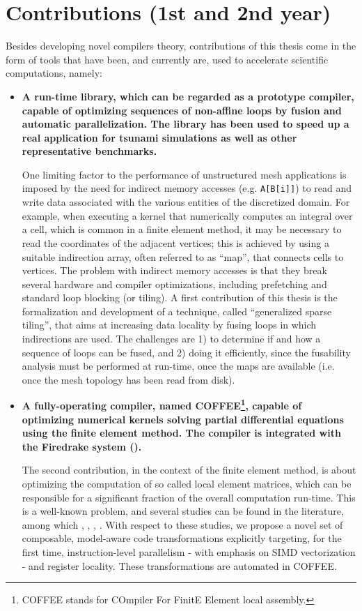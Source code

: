 \section{Contributions (1st and 2nd year)}
\label{sec:contributions}
Besides developing novel compilers theory, contributions of this thesis come in the form of tools that have been, and currently are, used to accelerate scientific computations, namely:
\begin{itemize}
\item \textbf{A run-time library, which can be regarded as a prototype compiler, capable of optimizing sequences of non-affine loops by fusion and automatic parallelization. The library has been used to speed up a real application for tsunami simulations as well as other representative benchmarks.}

One limiting factor to the performance of unstructured mesh applications is imposed by
the need for indirect memory accesses (e.g. \texttt{A[B[i]]}) to read and
write data associated with the various entities of the discretized domain.
For example, when executing a kernel that numerically computes an integral over a cell, 
which is common in a finite element method, it may be necessary
to read the coordinates of the adjacent vertices; this is achieved by
using a suitable indirection array, often referred to as ``map'', that
connects cells to vertices. The problem with indirect 
memory accesses is that they break several hardware and compiler optimizations,
including prefetching and standard loop blocking (or tiling). A first contribution of this thesis
is the formalization and development of a technique, called ``generalized sparse tiling'',
that aims at increasing data locality by fusing loops in which indirections
are used. The challenges are 1) to determine if and how a sequence of loops can be fused,
and 2) doing it efficiently, since the fusability analysis must be performed at
run-time, once the maps are available (i.e. once the mesh topology has been read 
from disk).

\item \textbf{A fully-operating compiler, named COFFEE\footnote{COFFEE stands for COmpiler For FinitE Element local assembly.}, capable of optimizing numerical kernels solving partial differential equations using the finite element method. The compiler is integrated with the Firedrake system (\cite{firedrake-code}).}

The second contribution, in the context of the finite element method, is about optimizing the computation of so called local element matrices, which can be responsible for a significant fraction of the overall computation run-time. This is a well-known problem, and several studies can be found in the literature, among which \citep{francis}, \citep{quadrature-olegaard}, \citep{petsc-integration-gpu}, \citep{tensor-kirby}. With respect to these studies, we propose a novel set of composable, model-aware code transformations explicitly targeting, for the first time, instruction-level parallelism - with emphasis on SIMD vectorization - and register locality. These transformations are automated in COFFEE.
\end{itemize}

